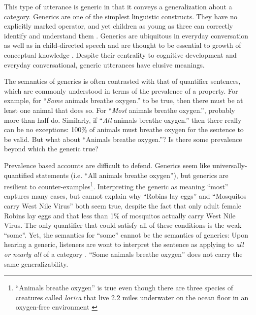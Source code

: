 \documentclass[10pt,letterpaper]{article}
\begin{document}
%
This type of utterance is generic \cite{Carlson1977, Leslie2008} in that it conveys a generalization about a category.  Generics are one of the simplest linguistic constructs. They have no explicitly marked operator, and yet children as young as three can correctly identify and understand them \cite{Cimpian2008}. Generics are ubiquitous in everyday conversation as well as in child-directed speech \cite{Gelman2008} and are thought to be essential to growth of conceptual knowledge \cite{Gelman2004}. 
Despite their centrality to cognitive development and everyday conversational, generic utterances have elusive meanings. %

The semantics of generics is often contrasted with that of quantifier sentences, which are commonly understood in terms of the prevalence of a property. 
For example, for ``\emph{Some} animals breathe oxygen.'' to be true, then there must be at least one animal that does so. 
For ``\emph{Most} animals breathe oxygen.'', probably more than half do. 
Similarly, if ``\emph{All} animals breathe oxygen.'' then there really can be no exceptions: 100\% of animals must breathe oxygen for the sentence to be valid. 
But what about ``Animals breathe oxygen.''? 
Is there some prevalence beyond which the generic true?

Prevalence based accounts are difficult to defend. 
Generics seem like universally-quantified statements (i.e. ``All animals breathe oxygen''), but generics are resilient to counter-examples\footnote{``Animals breathe oxygen'' is true even though there are three species of creatures called \emph{lorica} that live 2.2 miles underwater on the ocean floor in an oxygen-free environment \cite{Danovaro2010}}. 
Interpreting the generic as meaning ``most'' captures many cases, but cannot explain why ``Robins lay eggs'' and ``Mosquitos carry West Nile Virus'' both seem true, despite the fact that only adult female Robins lay eggs and that less than 1\% of mosquitos actually carry West Nile Virus. 
The only quantifier that could satisfy all of these conditions is the weak ``some''.  
Yet, the semantics for ``some'' cannot be the semantics of generics:  Upon hearing a generic, listeners are wont to interpret the sentence as applying to \emph{all or nearly all} of a category \cite{Gelman2002, Cimpian2010}. 
``Some animals breathe oxygen'' does not carry the same generalizability.
\end{document}
